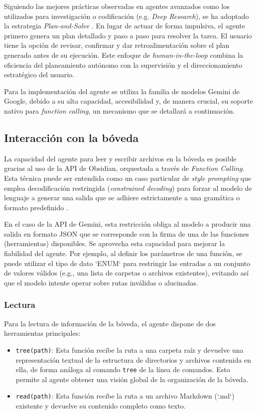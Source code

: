 Siguiendo las mejores prácticas observadas en agentes avanzados como los utilizados para investigación o codificación (e.g. \textit{Deep Research}), se ha adoptado la estrategia \textit{Plan-and-Solve} \parencite{wangPlanandSolvePromptingImproving2023}. En lugar de actuar de forma impulsiva, el agente primero genera un plan detallado y paso a paso para resolver la tarea. El usuario tiene la opción de revisar, confirmar y dar retroalimentación sobre el plan generado antes de su ejecución. Este enfoque de \textit{human-in-the-loop} combina la eficiencia del planeamiento autónomo con la supervisión y el direccionamiento estratégico del usuario.

Para la implementación del agente se utiliza la familia de modelos Gemini de Google, debido a su alta capacidad, accesibilidad y, de manera crucial, su soporte nativo para \textit{function calling}, un mecanismo que se detallará a continuación.

\subsection{Interacción con la bóveda}
La capacidad del agente para leer y escribir archivos en la bóveda es posible gracias al uso de la API de Obsidian, orquestada a través de \textit{Function Calling}. Esta técnica puede ser entendida como un caso particular de \textit{style prompting} que emplea decodificación restringida (\textit{constrained decoding}) para forzar al modelo de lenguaje a generar una salida que se adhiere estrictamente a una gramática o formato predefinido \parencite{gengGrammarConstrainedDecodingStructured2024}.

En el caso de la API de Gemini, esta restricción obliga al modelo a producir una salida en formato JSON que se corresponde con la firma de una de las funciones (herramientas) disponibles. Se aprovecha esta capacidad para mejorar la fiabilidad del agente. Por ejemplo, al definir los parámetros de una función, se puede utilizar el tipo de dato `ENUM` para restringir las entradas a un conjunto de valores válidos (e.g., una lista de carpetas o archivos existentes), evitando así que el modelo intente operar sobre rutas inválidas o alucinadas.

\subsubsection{Lectura}
Para la lectura de información de la bóveda, el agente dispone de dos herramientas principales:
\begin{itemize}
    \item \texttt{tree(path)}: Esta función recibe la ruta a una carpeta raíz y devuelve una representación textual de la estructura de directorios y archivos contenida en ella, de forma análoga al comando \texttt{tree} de la línea de comandos. Esto permite al agente obtener una visión global de la organización de la bóveda.
    \item \texttt{read(path)}: Esta función recibe la ruta a un archivo Markdown (`.md`) existente y devuelve su contenido completo como texto.
\end{itemize}
 
